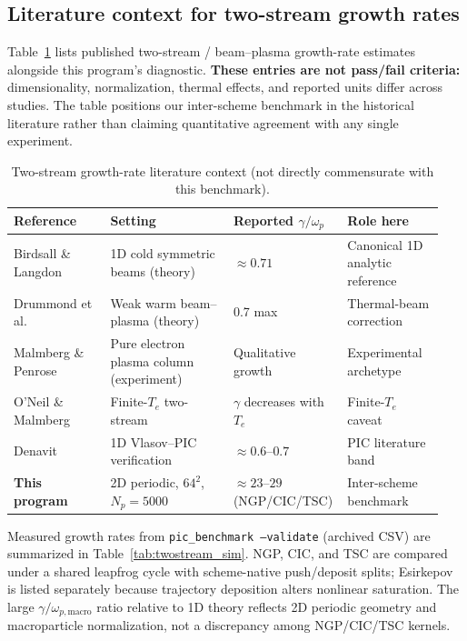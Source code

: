 \subsection{Literature context for two-stream growth rates}
\label{sec:lit_gamma}

Table~\ref{tab:lit_gamma} lists published two-stream / beam--plasma growth-rate estimates alongside this program's diagnostic.
\textbf{These entries are not pass/fail criteria:} dimensionality, normalization, thermal effects, and reported units differ across studies.
The table positions our inter-scheme benchmark in the historical literature rather than claiming quantitative agreement with any single experiment.

\begin{table}[t]
\centering
\small
\caption{Two-stream growth-rate literature context (not directly commensurate with this benchmark).}
\label{tab:lit_gamma}
\begin{tabular}{@{}p{0.22\linewidth}p{0.28\linewidth}p{0.22\linewidth}p{0.22\linewidth}@{}}
\toprule
Reference & Setting & Reported $\gamma/\omega_p$ & Role here \\
\midrule
Birdsall \& Langdon~\cite{birdsall1991} & 1D cold symmetric beams (theory) & $\approx 0.71$ & Canonical 1D analytic reference \\
Drummond {et al.}~\cite{drummond1970} & Weak warm beam--plasma (theory) & 0.7 max & Thermal-beam correction \\
Malmberg \& Penrose~\cite{malmberg1967} & Pure electron plasma column (experiment) & Qualitative growth & Experimental archetype \\
O{'}Neil \& Malmberg~\cite{oneil1968} & Finite-$T_e$ two-stream & $\gamma$ decreases with $T_e$ & Finite-$T_e$ caveat \\
Denavit~\cite{denavit1983} & 1D Vlasov--PIC verification & $\approx 0.6$--$0.7$ & PIC literature band \\
\textbf{This program} & 2D periodic, $64^2$, $N_p=5000$ & $\approx 23$--$29$ (NGP/CIC/TSC) & Inter-scheme benchmark \\
\bottomrule
\end{tabular}
\end{table}

Measured growth rates from \texttt{pic\_benchmark --validate} (archived CSV) are summarized in Table~\ref{tab:twostream_sim}.
NGP, CIC, and TSC are compared under a shared leapfrog cycle with scheme-native push/deposit splits; Esirkepov is listed separately because trajectory deposition alters nonlinear saturation.
The large $\gamma/\omega_{p,\mathrm{macro}}$ ratio relative to 1D theory reflects 2D periodic geometry and macroparticle normalization, not a discrepancy among NGP/CIC/TSC kernels.


